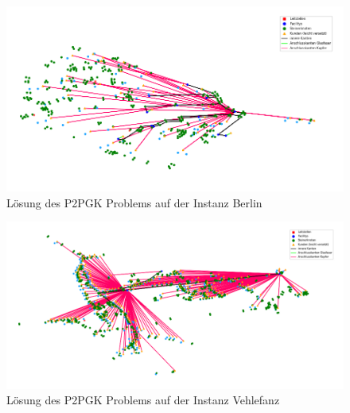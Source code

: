 \documentclass[11pt,a4paper]{article}
\theoremstyle{my_th_style1}
\begin{document}
\begin{figure}[!htbp]
	\begin{center}
		\begin{minipage}{15.0cm}
			\includegraphics[width=1\textwidth]{./Bilder/P2PGK_Berlin_demand1_duration0}
			\caption{Lösung des P2PGK Problems auf der Instanz Berlin}
			\label{p2pgk_b_pic}
		\end{minipage}
	\end{center}
\end{figure}

\begin{figure}[!htbp]
	\begin{center}
		\begin{minipage}{15.0cm}
			\includegraphics[width=1\textwidth]{./Bilder/P2PGK_Vehlefanz_demand1_duration0}
			\caption{Lösung des P2PGK Problems auf der Instanz Vehlefanz}
			\label{p2pgk_v_pic}
		\end{minipage}
	\end{center}
\end{figure}
\end{document}
